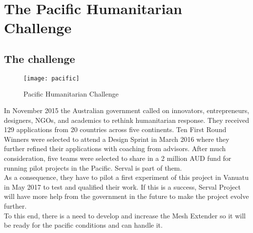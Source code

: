 \section{The Pacific Humanitarian Challenge}
\subsection{The challenge}
\begin{figure}[h]
\centering
\texttt{[image: pacific]}
\caption{Pacific Humanitarian Challenge}
\end{figure}
In November 2015 the Australian government called on innovators, entrepreneurs, designers, NGOs, and academics to rethink humanitarian response. They received 129 applications from 20 countries across five continents. Ten First Round Winners were selected to attend a Design Sprint in March 2016 where they further refined their applications with coaching from advisors. After much consideration, five teams were selected to share in a 2 million AUD fund for running pilot projects in the Pacific. Serval is part of them. \\
As a consequence, they have to pilot a first experiment of this project in Vanuatu in May 2017 to test and qualified their work. If this is a success, Serval Project will have more help from the government in the future to make the project evolve further. \\
To this end, there is a need to develop and increase the Mesh Extender so it will be ready for the pacific conditions and can handle it.

